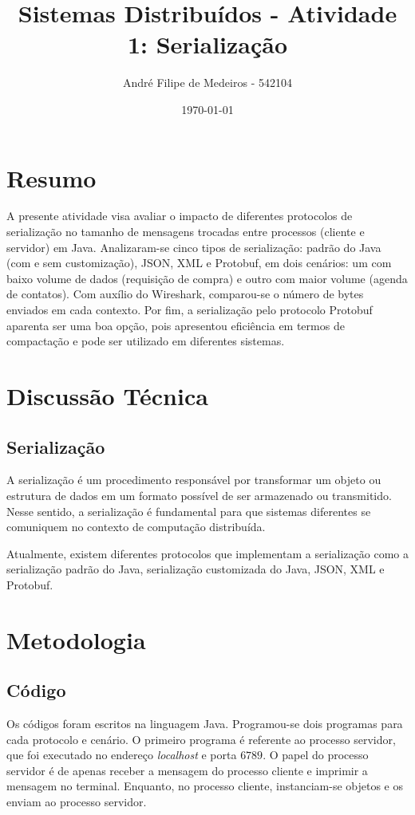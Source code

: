 \documentclass{article}
\title{Sistemas Distribuídos - Atividade 1: Serialização}
\author{André Filipe de Medeiros - 542104}
\date{\today}
\begin{document}
\maketitle

\newpage
\section{Resumo}
A presente atividade visa avaliar o impacto de diferentes protocolos de serialização no tamanho de mensagens trocadas entre processos (cliente e servidor) em Java. Analizaram-se cinco tipos de serialização: padrão do Java (com e sem customização), JSON, XML e Protobuf, em dois cenários: um com baixo volume de dados (requisição de compra) e outro com maior volume (agenda de contatos). Com auxílio do Wireshark, comparou-se o número de bytes enviados em cada contexto.
 Por fim, a serialização pelo protocolo Protobuf aparenta ser uma boa opção, pois apresentou eficiência em termos de compactação e pode ser utilizado em diferentes sistemas.

\section{Discussão Técnica}

\subsection{Serialização}
A serialização é um procedimento responsável por transformar um objeto ou estrutura de dados em um formato possível de ser armazenado ou transmitido. Nesse sentido, a serialização é fundamental para que sistemas diferentes se comuniquem no contexto de computação distribuída.

Atualmente, existem diferentes protocolos que implementam a serialização como a serialização padrão do Java, serialização customizada do Java, JSON, XML e Protobuf. 

\section{Metodologia}

\subsection{Código}
Os códigos foram escritos na linguagem Java. Programou-se dois programas para cada protocolo e cenário. O primeiro programa é referente ao processo servidor, que foi executado no endereço \textit{localhost} e porta $6789$. O papel do processo servidor é de apenas receber a mensagem do processo cliente e imprimir a mensagem no terminal. Enquanto, no processo cliente, instanciam-se objetos e os enviam ao processo servidor. 
\end{document}
